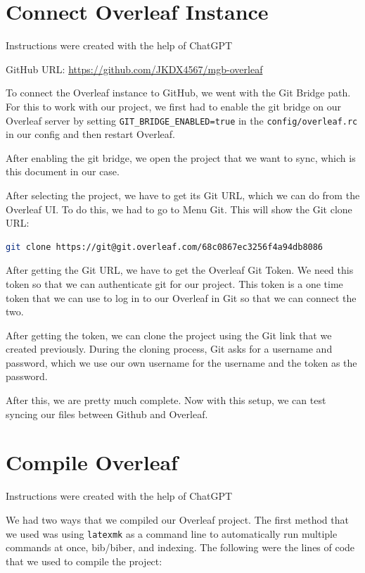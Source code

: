 \section{Connect Overleaf Instance}
Instructions were created with the help of ChatGPT

GitHub URL: \href{https://github.com/JKDX4567/mgb-overleaf}{https://github.com/JKDX4567/mgb-overleaf}

To connect the Overleaf instance to GitHub, we went with the Git Bridge path. For this to work with our project, we first had to enable the git bridge on our Overleaf server by setting \texttt{GIT\_BRIDGE\_ENABLED=true} in the \texttt{config/overleaf.rc} in our config and then restart Overleaf.

After enabling the git bridge, we open the project that we want to sync, which is this document in our case.

After selecting the project, we have to get its Git URL, which we can do from the Overleaf UI. To do this, we had to go to Menu \textrightarrow{} Git. This will show the Git clone URL: 
\begin{lstlisting}[style=linuxstyle, language=bash]
git clone https://git@git.overleaf.com/68c0867ec3256f4a94db8086
\end{lstlisting}

After getting the Git URL, we have to get the Overleaf Git Token. We need this token so that we can authenticate git for our project. This token is a one time token that we can use to log in to our Overleaf in Git so that we can connect the two.

After getting the token, we can clone the project using the Git link that we created previously. During the cloning process, Git asks for a username and password, which we use our own username for the username and the token as the password.

After this, we are pretty much complete. Now with this setup, we can test syncing our files between Github and Overleaf.

\section{Compile Overleaf}
Instructions were created with the help of ChatGPT

We had two ways that we compiled our Overleaf project. The first method that we used was using \texttt{latexmk} as a command line to automatically run multiple commands at once, bib/biber, and indexing. The following were the lines of code that we used to compile the project:

